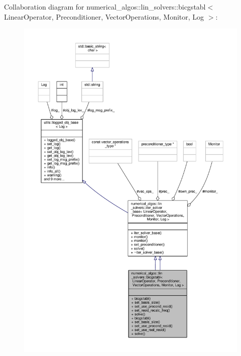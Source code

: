 Collaboration diagram for numerical\-\_\-algos\-:\-:lin\-\_\-solvers\-:\-:bicgstabl$<$ Linear\-Operator, Preconditioner, Vector\-Operations, Monitor, Log $>$\-:\nopagebreak
\begin{figure}[H]
\begin{center}
\leavevmode
\includegraphics[width=350pt]{classnumerical__algos_1_1lin__solvers_1_1bicgstabl__coll__graph}
\end{center}
\end{figure}

